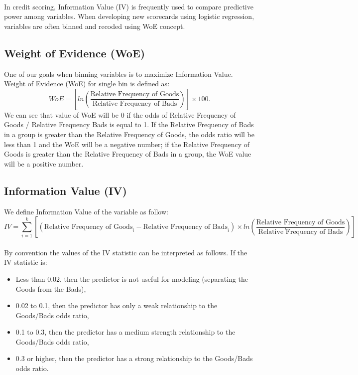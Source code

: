\documentclass[10pt]{article}\usepackage[]{graphicx}\usepackage[]{color}
\begin{document}
\paragraph{}
In credit scoring, Information Value (IV) is frequently used to compare predictive power among variables. When developing new scorecards using logistic regression, variables are often binned and recoded using WoE concept. 

\subsection{Weight of Evidence (WoE)}
One of our goals when binning variables is to maximize Information Value. Weight of Evidence (WoE) for single bin is defined as:
$$WoE = \left [ ln\left ( \frac{\text{Relative Frequency of Goods}}{\text{Relative Frequency of Bads}} \right ) \right ]\times 100.$$
We can see that value of WoE will be 0 if the odds of Relative Frequency of Goods / Relative Frequency Bads is equal to 1. If the Relative Frequency of Bads in a group is greater than the Relative Frequency of Goods, the odds ratio will be less than 1 and the WoE will be a negative number; if the Relative Frequency of Goods is greater than the Relative Frequency of Bads in a group, the WoE value will be a positive number. 

\subsection{Information Value (IV)}
We define Information Value of the variable as follow: 
$$IV = \sum_{i=1}^{k}\left [ (\text{Relative Frequency of Goods}_i-\text{Relative Frequency of Bads}_i) \times ln\left ( \frac{\text{Relative Frequency of Goods}}{\text{Relative Frequency of Bads}} \right )  \right ],$$
\paragraph{}
By convention the values of the IV statistic can be interpreted as follows. If the IV statistic is:
\begin{itemize}
\item Less than 0.02, then the predictor is not useful for modeling (separating the Goods from the Bads),
\item 0.02 to 0.1, then the predictor has only a weak relationship to the Goods/Bads odds ratio,
\item 0.1 to 0.3, then the predictor has a medium strength relationship to the Goods/Bads odds ratio,
\item 0.3 or higher, then the predictor has a strong relationship to the Goods/Bads odds ratio.
\end{itemize}
\end{document}
